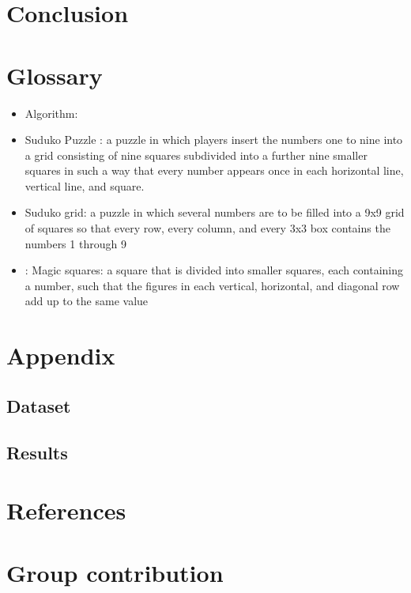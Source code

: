 \documentclass[12pt]{article}
\begin{document}
\section{Conclusion}
\section{Glossary}
\begin{itemize}
\item Algorithm: 
\item Suduko Puzzle : a puzzle in which players insert the numbers one to nine into a grid consisting of nine squares subdivided into a further nine smaller squares in such a way that every number appears once in each horizontal line, vertical line, and square.
\item Suduko grid:  a puzzle in which several numbers are to be filled into a 9x9 grid of squares so that every row, every column, and every 3x3 box contains the numbers 1 through 9
\item: Magic squares: a square that is divided into smaller squares, each containing a number, such that the figures in each vertical, horizontal, and diagonal row add up to the same value

\end{itemize}
\section{Appendix}
\subsection{Dataset}
\subsection{Results}
\section{References}
\section{Group contribution}
\end{document}
